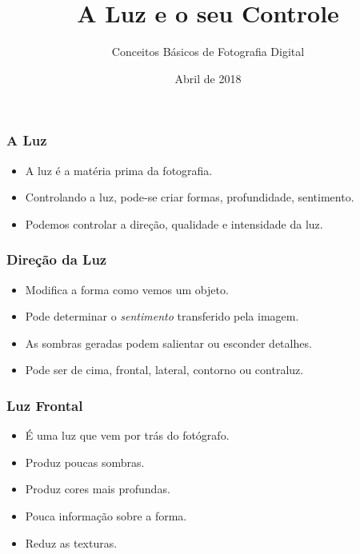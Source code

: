 


\subtitle{Conceitos Básicos de Fotografia Digital}
\title{A Luz e o seu Controle}
\author{}
\date{Abril de 2018}



\coverframe

\begin{frame}
    \frametitle{A Luz}
    \begin{itemize}
      \item A luz é a matéria prima da fotografia.
      \item Controlando a luz, pode-se criar formas, profundidade, sentimento.
      \item Podemos controlar a direção, qualidade e intensidade da luz.
    \end{itemize}
\end{frame}

\begin{frame}
    \frametitle{Direção da Luz}
    \begin{itemize}
      \item Modifica a forma como vemos um objeto.
      \item Pode determinar o \textit{sentimento} transferido pela imagem.
      \item As sombras geradas podem salientar ou esconder detalhes.
      \item Pode ser de cima, frontal, lateral, contorno ou contraluz.
    \end{itemize}
\end{frame}

\begin{frame}
  \frametitle{Luz Frontal}
  \begin{itemize}
    \item É uma luz que vem por trás do fotógrafo.
    \item Produz poucas sombras.
    \item Produz cores mais profundas.
    \item Pouca informação sobre a forma.
    \item Reduz as texturas.
  \end{itemize}
\end{frame}


